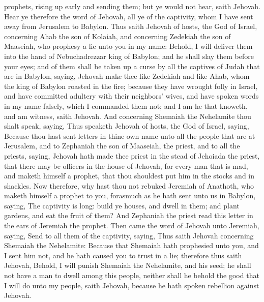 prophets, rising up early and sending them; but ye would not hear, saith Jehovah. Hear ye therefore the word of Jehovah, all ye of the captivity, whom I have sent away from Jerusalem to Babylon.  Thus saith Jehovah of hosts, the God of Israel, concerning Ahab the son of Kolaiah, and concerning Zedekiah the son of Maaseiah, who prophesy a lie unto you in my name: Behold, I will deliver them into the hand of Nebuchadrezzar king of Babylon; and he shall slay them before your eyes; and of them shall be taken up a curse by all the captives of Judah that are in Babylon, saying, Jehovah make thee like Zedekiah and like Ahab, whom the king of Babylon roasted in the fire; because they have wrought folly in Israel, and have committed adultery with their neighbors’ wives, and have spoken words in my name falsely, which I commanded them not; and I am he that knoweth, and am witness, saith Jehovah.  And concerning Shemaiah the Nehelamite thou shalt speak, saying, Thus speaketh Jehovah of hosts, the God of Israel, saying, Because thou hast sent letters in thine own name unto all the people that are at Jerusalem, and to Zephaniah the son of Maaseiah, the priest, and to all the priests, saying, Jehovah hath made thee priest in the stead of Jehoiada the priest, that there may be officers in the house of Jehovah, for every man that is mad, and maketh himself a prophet, that thou shouldest put him in the stocks and in shackles. Now therefore, why hast thou not rebuked Jeremiah of Anathoth, who maketh himself a prophet to you, forasmuch as he hath sent unto us in Babylon, saying, The captivity is long: build ye houses, and dwell in them; and plant gardens, and eat the fruit of them? And Zephaniah the priest read this letter in the ears of Jeremiah the prophet. Then came the word of Jehovah unto Jeremiah, saying, Send to all them of the captivity, saying, Thus saith Jehovah concerning Shemaiah the Nehelamite: Because that Shemaiah hath prophesied unto you, and I sent him not, and he hath caused you to trust in a lie; therefore thus saith Jehovah, Behold, I will punish Shemaiah the Nehelamite, and his seed; he shall not have a man to dwell among this people, neither shall he behold the good that I will do unto my people, saith Jehovah, because he hath spoken rebellion against Jehovah. 

